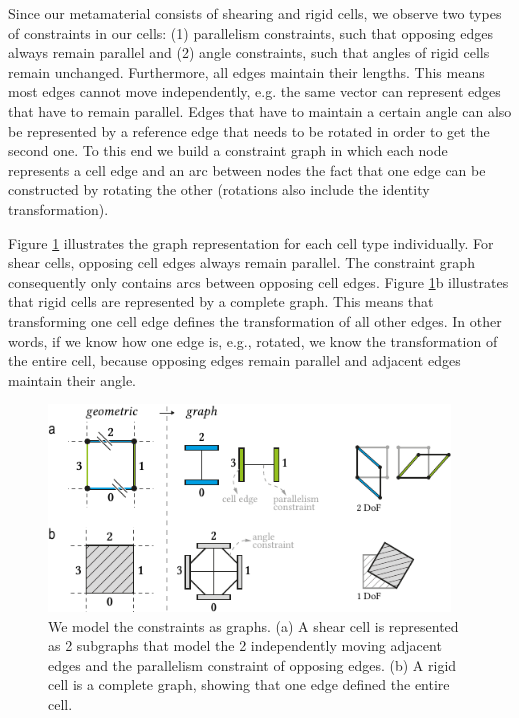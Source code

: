 Since our metamaterial consists of shearing and rigid cells, we observe two types of constraints in our cells: (1) parallelism constraints, such that opposing edges always remain parallel and (2) angle constraints, such that angles of rigid cells remain unchanged. Furthermore, all edges maintain their lengths. 
This means most edges cannot move independently, e.g. the same vector can represent edges that have to remain parallel. Edges that have to maintain a certain angle can also be represented by a reference edge that needs to be rotated in order to get the second one. To this end we build a constraint graph in which each node represents a cell edge and an arc between nodes the fact that one edge can be constructed by rotating the other (rotations also include the identity transformation).

Figure \ref{fig:7-single-cell-constraint-graph} illustrates the graph representation for each cell type individually. For shear cells, opposing cell edges always remain parallel. The constraint graph consequently only contains arcs between opposing cell edges. Figure \ref{fig:7-single-cell-constraint-graph}b illustrates that rigid cells are represented by a complete graph. This means that transforming one cell edge defines the transformation of all other edges. In other words, if we know how one edge is, e.g., rotated, we know the transformation of the entire cell, because opposing edges remain parallel and adjacent edges maintain their angle.

\begin{figure} [h]
    \centering
    \includegraphics[width=0.95\textwidth]{chapters/understanding-metamaterial-mechanisms-FIG/7-single-cell-constraint-graph.pdf}
    \caption[Short figure name.]{We model the constraints as graphs. (a) A shear cell is represented as 2 subgraphs that model the 2 independently moving adjacent edges and the parallelism constraint of opposing edges. (b) A rigid cell is a complete graph, showing that one edge defined the entire cell.
    \label{fig:7-single-cell-constraint-graph}}
\end{figure}


